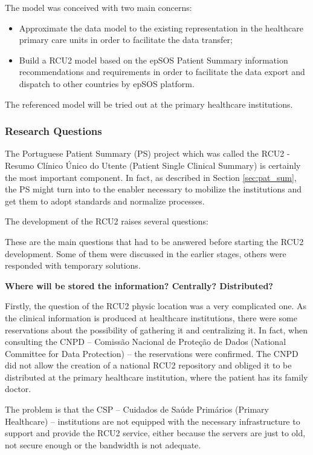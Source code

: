 The model was conceived with two main concerns:
\begin{itemize}
\item Approximate the data model to the existing representation in the healthcare primary care units in order to facilitate the data transfer;
\item Build a RCU2 model based on the epSOS Patient Summary information recommendations and requirements in order to facilitate the data export and dispatch to other countries by epSOS platform.
\end{itemize}

The referenced model will be tried out at the primary healthcare institutions.



\subsubsection{Research Questions}

The Portuguese Patient Summary (PS) project which was called the RCU2 - Resumo Clínico Único do Utente (Patient Single Clinical Summary) is certainly the most important component. In fact, as described in Section \ref{sec:pat_sum}, the PS might turn into to the enabler necessary to mobilize the institutions and get them to adopt standards and normalize processes.

The development of the RCU2 raises several questions:

These are the main questions that had to be answered before starting the RCU2 development. Some of them were discussed in the earlier stages, others were responded with temporary solutions.



\textbf{Where will be stored the information? Centrally? Distributed?}

Firstly, the question of the RCU2 physic location was a very complicated one. As the clinical information is produced at healthcare institutions, there were some reservations about the possibility of gathering it and centralizing it. In fact, when consulting the CNPD -- Comissão Nacional de Proteção de Dados (National Committee for Data Protection) -- the reservations were confirmed. The CNPD did not allow the creation of a national RCU2 repository and obliged it to be distributed at the primary healthcare institution, where the patient has its family doctor.

The problem is that the CSP -- Cuidados de Saúde Primários (Primary Healthcare) -- institutions are not equipped with the necessary infrastructure to support and provide the RCU2 service, either because the servers are just to old, not secure enough or the bandwidth is not adequate.

